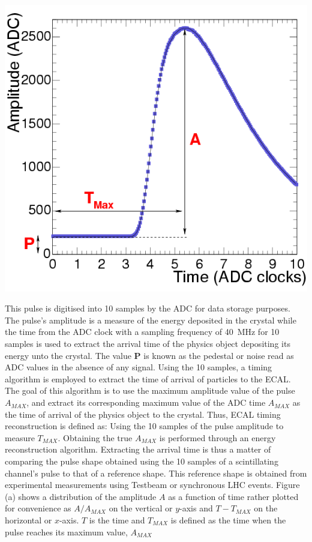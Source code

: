 \begin{center}\label{pulse}
\centering
\mbox{\includegraphics[scale=0.6]{THESISPLOTS/Time_Amplitude_Profile.png}}
\label{fig:pulse}
\end{center}

This pulse is digitised into 10 samples by the ADC for data storage purposes. The pulse's amplitude  is a measure of the energy deposited in the crystal while the time from the ADC clock with a sampling frequency of 40~MHz for 10 samples is used to extract the arrival time of the physics object depositing its energy unto the crystal. The value \textbf{P} is known as the pedestal or noise read as ADC values in the absence of any signal. Using the 10 samples, a timing algorithm is employed to extract the time of arrival of particles to the ECAL. The goal of this algorithm is to use the maximum amplitude value of the pulse $A_{MAX}$, and extract its corresponding maximum value of the ADC time $A_{MAX}$ as the time of arrival of the physics object to the crystal. Thus, ECAL timing reconstruction is defined as: Using the 10 samples of the pulse amplitude to measure $T_{MAX}$. Obtaining the true $A_{MAX}$ is performed through an energy reconstruction algorithm. Extracting the arrival time is thus a matter of comparing the pulse shape obtained using the 10 samples of a scintillating channel's pulse to that of a reference shape.
This reference shape is obtained from experimental measurements using Testbeam or synchronous LHC events. Figure \label{amplVsTmax}(a) shows a distribution of the amplitude $A$ as a function of time rather plotted for convenience as $A/A_{MAX}$ on the vertical or $y$-axis and $T - T_{MAX}$ on the horizontal or $x$-axis. $T$ is the time and $T_{MAX}$ is defined as the time when the  pulse reaches its maximum value, $A_{MAX}$ 

